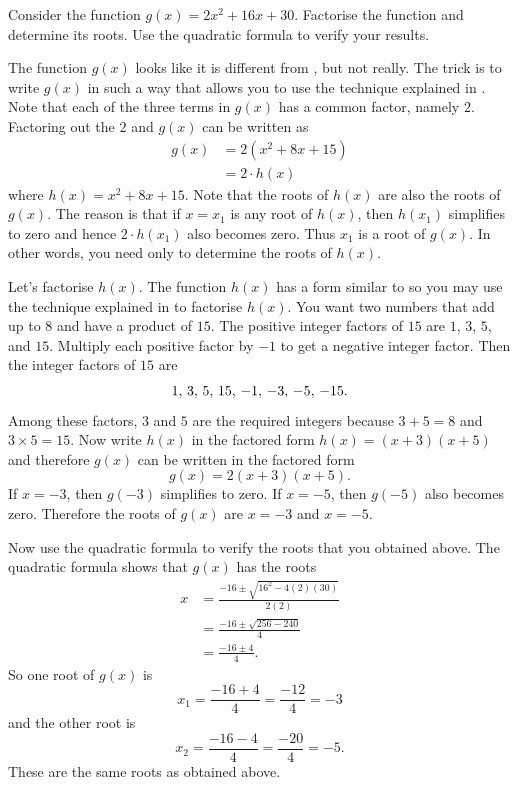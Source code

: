 \documentclass[a4paper,oneside,12pt]{article}
\begin{document}
\begin{example}
Consider the function $g(x) = 2x^2 + 16x + 30$.  Factorise the
function and determine its roots.  Use the quadratic formula to verify
your results.
\end{example}

\begin{solution}
The function $g(x)$ looks like it is different from
, but not really.
The trick is to write $g(x)$ in such a way that allows you to use the
technique explained in
.  Note that each of
the three terms in $g(x)$ has a common factor, namely $2$.  Factoring
out the $2$ and $g(x)$ can be written as
\begin{align*}
g(x)
&=
2 (x^2 + 8x + 15) \\[4pt]
&=
2 \cdot h(x)
\end{align*}
where $h(x) = x^2 + 8x + 15$.  Note that the roots of $h(x)$ are also
the roots of $g(x)$.  The reason is that if $x = x_1$ is any root of
$h(x)$, then $h(x_1)$ simplifies to zero and hence $2 \cdot h(x_1)$
also becomes zero.  Thus $x_1$ is a root of $g(x)$.  In other words,
you need only to determine the roots of $h(x)$.

Let's factorise $h(x)$.  The function $h(x)$ has a form similar to
 so you may use the
technique explained in 
to factorise $h(x)$.  You want two numbers that add up to $8$ and have
a product of $15$.  The positive integer factors of $15$ are $1$, $3$,
$5$, and $15$.  Multiply each positive factor by $-1$ to get a
negative integer factor.  Then the integer factors of $15$ are
\[
{1},\, {3},\, {5},\, {15},\, {-1},\, {-3},\, {-5},\, {-15}.
\]
Among these factors, $3$ and $5$ are the required integers because
$3 + 5 = 8$ and $3 \times 5 = 15$.  Now write $h(x)$ in the factored
form $h(x) = (x + 3) (x + 5)$ and therefore $g(x)$ can be written in
the factored form
\[
g(x)
=
2 (x + 3) (x + 5).
\]
If $x = -3$, then $g(-3)$ simplifies to zero.  If $x = -5$, then
$g(-5)$ also becomes zero.  Therefore the roots of $g(x)$ are
$x = -3$ and $x = -5$.

Now use the quadratic formula to verify the roots that you obtained
above.  The quadratic formula shows that $g(x)$ has the roots
\begin{align*}
x
&=
\frac{
  -16
  \pm
  \sqrt{16^2 - 4(2)(30)}
}{
  2(2)
} \\[4pt]
&=
\frac{
  -16
  \pm
  \sqrt{256 - 240}
}{
  4
} \\[4pt]
&=
\frac{
  -16 \pm 4
}{
  4
}.
\end{align*}
So one root of $g(x)$ is
\[
x_1
=
\frac{-16 + 4}{4}
=
\frac{-12}{4}
=
-3
\]
and the other root is
\[
x_2
=
\frac{-16 - 4}{4}
=
\frac{-20}{4}
=
-5.
\]
These are the same roots as obtained above.
\end{solution}
\end{document}
